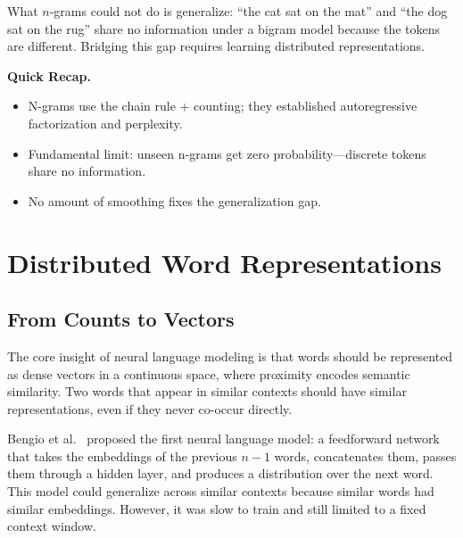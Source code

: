 What $n$-grams could not do is generalize: ``the cat sat on the mat'' and ``the dog sat on the rug'' share no information under a bigram model because the tokens are different. Bridging this gap requires learning distributed representations.

\medskip
\noindent{}
\medskip

\begin{quickrecap}
\textbf{Quick Recap.}
\begin{itemize}[nosep,leftmargin=1.5em]
  \item N-grams use the chain rule + counting; they established autoregressive factorization and perplexity.
  \item Fundamental limit: unseen n-grams get zero probability---discrete tokens share no information.
  \item No amount of smoothing fixes the generalization gap.
\end{itemize}
\end{quickrecap}

\section{Distributed Word Representations}

\subsection{From Counts to Vectors}

The core insight of neural language modeling is that words should be represented as dense vectors in a continuous space, where proximity encodes semantic similarity. Two words that appear in similar contexts should have similar representations, even if they never co-occur directly.

Bengio et al.~\cite{bengio2003neural} proposed the first neural language model: a feedforward network that takes the embeddings of the previous $n-1$ words, concatenates them, passes them through a hidden layer, and produces a distribution over the next word. This model could generalize across similar contexts because similar words had similar embeddings. However, it was slow to train and still limited to a fixed context window.

